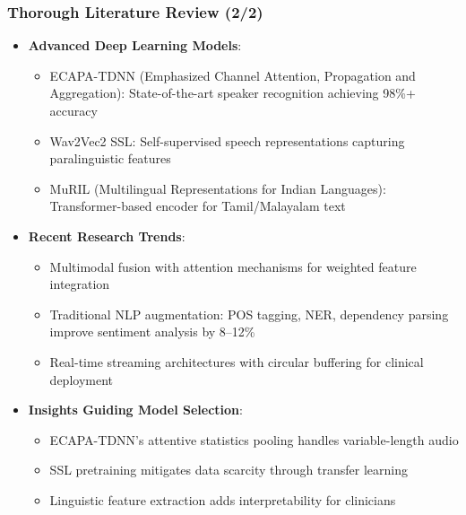 \documentclass{beamer}
\begin{document}
\begin{frame}
\frametitle{Thorough Literature Review (2/2)}
\begin{itemize}
    \item \textbf{Advanced Deep Learning Models}:
    \begin{itemize}
        \item ECAPA-TDNN (Emphasized Channel Attention, Propagation and Aggregation): State-of-the-art speaker recognition achieving 98\%+ accuracy
        \item Wav2Vec2 SSL: Self-supervised speech representations capturing paralinguistic features
        \item MuRIL (Multilingual Representations for Indian Languages): Transformer-based encoder for Tamil/Malayalam text
    \end{itemize}
    \item \textbf{Recent Research Trends}:
    \begin{itemize}
        \item Multimodal fusion with attention mechanisms for weighted feature integration
        \item Traditional NLP augmentation: POS tagging, NER, dependency parsing improve sentiment analysis by 8--12\%
        \item Real-time streaming architectures with circular buffering for clinical deployment
    \end{itemize}
    \item \textbf{Insights Guiding Model Selection}:
    \begin{itemize}
        \item ECAPA-TDNN's attentive statistics pooling handles variable-length audio
        \item SSL pretraining mitigates data scarcity through transfer learning
        \item Linguistic feature extraction adds interpretability for clinicians
    \end{itemize}
\end{itemize}
\end{frame}
\end{document}
